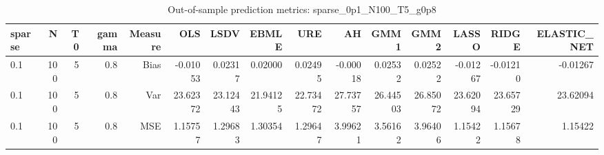 \begin{table}[!htbp]\centering
\caption{Out-of-sample prediction metrics: sparse_0p1_N100_T5_g0p8}
\label{tab:table3_sparse_0p1_N100_T5_g0p8}
\begin{tabular}{lrrrrrrrrrrrrrr}
\hline
sparse & N & T0 & gamma & Measure & OLS & LSDV & EBMLE & URE & AH & GMM1 & GMM2 & LASSO & RIDGE & ELASTIC_NET \\
\hline
0.1 & 100 & 5 & 0.8 & Bias & -0.01053 & 0.02317 & 0.02000 & 0.02495 & -0.00018 & 0.02532 & 0.02522 & -0.01267 & -0.01210 & -0.01267 \\
0.1 & 100 & 5 & 0.8 & Var & 23.62372 & 23.12443 & 21.94125 & 22.73472 & 27.73757 & 26.44503 & 26.85072 & 23.62094 & 23.65729 & 23.62094 \\
0.1 & 100 & 5 & 0.8 & MSE & 1.15757 & 1.29683 & 1.30354 & 1.29647 & 3.99621 & 3.56162 & 3.96406 & 1.15422 & 1.15678 & 1.15422 \\
\hline
\end{tabular}
\end{table}

